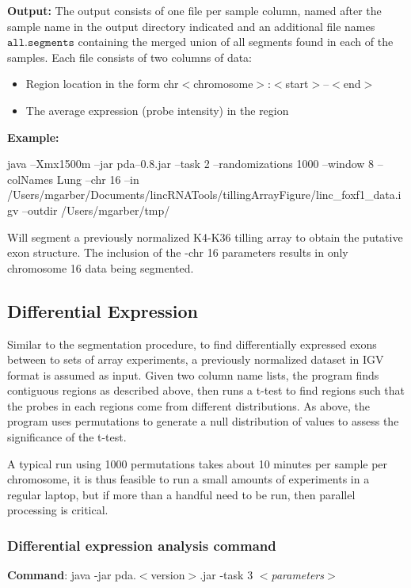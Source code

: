 \documentclass[11pt]{article}
\begin{document}
{\bf Output:} The output consists of one file per sample column, named after the sample name in the output directory indicated and an additional file names $\mathtt{ all.segments}$ containing the merged union of all segments found in each of the samples. Each file consists of two columns of data:
\begin{itemize}
\item Region location in the form chr$<$chromosome$>$:$<$start$>$--$<$end$>$
\item The average expression (probe intensity) in the region
\end{itemize}

{\bf Example:}


java --Xmx1500m  --jar pda--0.8.jar  --task 2 --randomizations 1000 --window 8  --colNames Lung --chr 16 --in /Users/mgarber/Documents/lincRNATools/tillingArrayFigure/linc\_foxf1\_data.igv --outdir /Users/mgarber/tmp/

Will segment a previously normalized K4-K36 tilling array to obtain the putative exon structure. The inclusion of the -chr 16 parameters results in only chromosome 16 data being segmented.

\subsection{Differential Expression}
Similar to the segmentation procedure, to find differentially expressed exons between to sets of array experiments, a previously normalized dataset in IGV format is assumed as input. Given two column name lists, the program finds contiguous regions as described above, then runs a t-test to find regions such that the probes in each regions come from different distributions. As above, the program uses permutations to generate a null distribution of values to assess the significance of the t-test.

A typical run using 1000 permutations takes about 10 minutes per sample per chromosome, it is thus feasible to run a small amounts of experiments in a regular laptop, but if more than a handful need to be run, then parallel processing is critical.

\subsubsection{Differential expression analysis command}
{\bf Command}: java -jar pda.$<$version$>$.jar -task 3 $<${\em parameters}$>$ 
\end{document}
